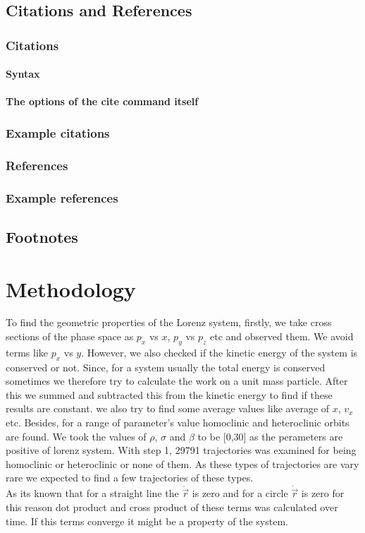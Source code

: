 \documentclass[%
 reprint,
 amsmath,amssymb,
 aps,
 floatfix,
]{revtex4-2}
\begin{document}
\subsection{\label{sec:citeref}Citations and References}


\subsubsection{Citations}


\paragraph{Syntax}


\paragraph{The options of the cite command itself}


\subsubsection{Example citations}


\subsubsection{References}


\subsubsection{Example references}




\subsection{Footnotes}%

\section{Methodology}
To find the geometric properties of the Lorenz system, firstly, we take cross sections of the phase space as $p_x$ vs $x$, $p_y$ vs $p_z$ etc and observed them. We avoid terms like $p_x$ vs $y$. However, we also checked if the kinetic energy of the system is conserved or not. Since, for a system usually the total energy is conserved sometimes we therefore try to calculate the work on a unit mass particle. After this we summed and subtracted this from the kinetic energy to find if these results are constant. 
we also try to find some average values like average of $x$, $v_x$ etc. Besides, for a range of parameter's value homoclinic and heteroclinic orbits are found. We took the values of $\rho$, $\sigma$ and $\beta$ to be [0,30] as the perameters are positive of lorenz system. With step 1, 29791 trajectories was examined for being homoclinic or heteroclinic or none of them. As these types of trajectories are vary rare we expected to find a few trajectories of these types.    \\
As its known that for a straight line the $\ddot{\vec{r}}$ is zero and for a circle $\dot{\vec{r}}$ is zero for this reason dot product and cross product of these terms was calculated over time. If this terms converge it might be a property of the system.
\end{document}
